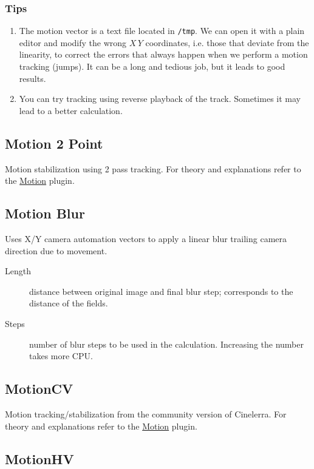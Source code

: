 \subsubsection*{Tips}
\label{ssub:tips}

\begin{enumerate}
    \item The motion vector is a text file located in \texttt{/tmp}. We can open it with a plain editor and modify the wrong $X\,Y$ coordinates, i.e. those that deviate from the linearity, to correct the errors that always happen when we perform a motion tracking (jumps). It can be a long and tedious job, but it leads to good results.
    \item You can try tracking using reverse playback of the track. Sometimes it may lead to a better calculation.
\end{enumerate}

\subsection{Motion 2 Point}%
\label{sub:motion_2_point}

Motion stabilization using 2 pass tracking. For theory and explanations refer to the \href{sub:motion}{Motion} plugin.

\subsection{Motion Blur}%
\label{sub:motion_blur}

Uses X/Y camera automation vectors to apply a linear blur trailing camera direction due to movement.
\begin{description}
    \item[Length] distance between original image and final blur step; corresponds to the distance of the fields.
    \item[Steps] number of blur steps to be used in the calculation. Increasing the number takes more CPU.
\end{description}

\subsection{MotionCV}%
\label{sub:motioncv}

Motion tracking/stabilization from the community version of Cinelerra. For theory and explanations refer to the \href{sub:motion}{Motion} plugin.

\subsection{MotionHV}%
\label{sub:motionhv}

